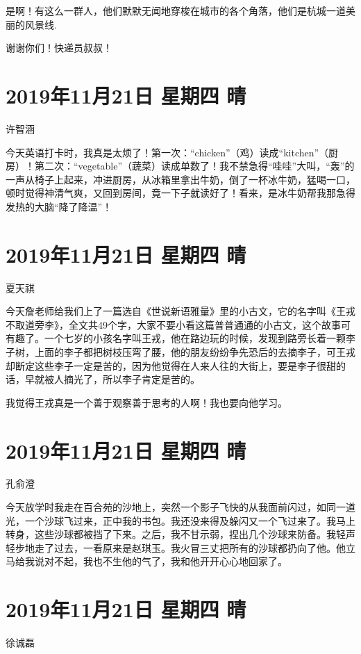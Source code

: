 是啊！有这么一群人，他们默默无闻地穿梭在城市的各个角落，他们是杭城一道美丽的风景线.

谢谢你们！快递员叔叔！

\section{2019年11月21日 星期四 晴}

许智涵

今天英语打卡时，我真是太烦了！第一次：``chicken''（鸡）读成``kitchen''（厨房）！第二次：``vegetable''（蔬菜）读成单数了！我不禁急得``哇哇''大叫，``轰''的一声从椅子上起来，冲进厨房，从冰箱里拿出牛奶，倒了一杯冰牛奶，猛喝一口，顿时觉得神清气爽，又回到房间，竟一下子就读好了！看来，是冰牛奶帮我那急得发热的大脑``降了降温''！

\section{2019年11月21日 星期四 晴}

夏天祺

今天詹老师给我们上了一篇选自《世说新语雅量》里的小古文，它的名字叫《王戎不取道旁李》，全文共49个字，大家不要小看这篇普普通通的小古文，这个故事可有趣了。一个七岁的小孩名字叫王戎，他在路边玩的时候，发现到路旁长着一颗李子树，上面的李子都把树枝压弯了腰，他的朋友纷纷争先恐后的去摘李子，可王戎却断定这些李子一定是苦的，因为他觉得在人来人往的大街上，要是李子很甜的话，早就被人摘光了，所以李子肯定是苦的。

我觉得王戎真是一个善于观察善于思考的人啊！我也要向他学习。

\section{2019年11月21日 星期四 晴}

孔俞澄

今天放学时我走在百合苑的沙地上，突然一个影子飞快的从我面前闪过，如同一道光，一个沙球飞过来，正中我的书包。我还没来得及躲闪又一个飞过来了。我马上转身，这些沙球都被挡了下来。之后，我不甘示弱，捏出几个沙球来防备。我轻声轻步地走了过去，一看原来是赵琪玉。我火冒三丈把所有的沙球都扔向了他。他立马给我说对不起，我也不生他的气了，我和他开开心心地回家了。

\section{2019年11月21日 星期四 晴}

徐诚磊

